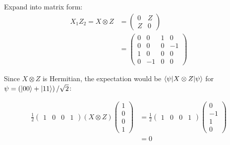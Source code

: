 \documentclass[all.tex]{subfiles}
\begin{document}
\ignorespaces
\parindent 0pt

\par Expand into matrix form:
\begin{align}
X_1 Z_2 = X \otimes Z &= \begin{pmatrix} 0 & Z \\ Z & 0 \end{pmatrix} \\
&= \begin{pmatrix} 0 & 0 & 1 & 0 \\ 0 & 0 & 0 & -1 \\ 1 & 0 & 0 & 0 \\ 0 & -1 &
0 & 0 \end{pmatrix}
\end{align}

Since $X \otimes Z$ is Hermitian, the expectation would be $\braket{\psi| X
\otimes Z | \psi}$ for $\psi = \left( \ket{00} + \ket{11} \right) / \sqrt{2}$:

\begin{align}
\frac{1}{2} \begin{pmatrix} 1 & 0 & 0 & 1 \end{pmatrix} \left( X \otimes Z
\right) \begin{pmatrix} 1 \\ 0 \\ 0 \\ 1 \end{pmatrix} &= \frac{1}{2}
\begin{pmatrix} 1 & 0 & 0 & 1 \end{pmatrix} \begin{pmatrix} 0 \\ -1 \\ 1 \\ 0
\end{pmatrix} \\
&= 0
\end{align}
\end{document}
